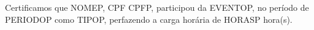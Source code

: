 Certificamos que NOMEP, CPF CPFP, participou da EVENTOP, no período de PERIODOP como TIPOP, perfazendo a carga horária de HORASP hora(s).
